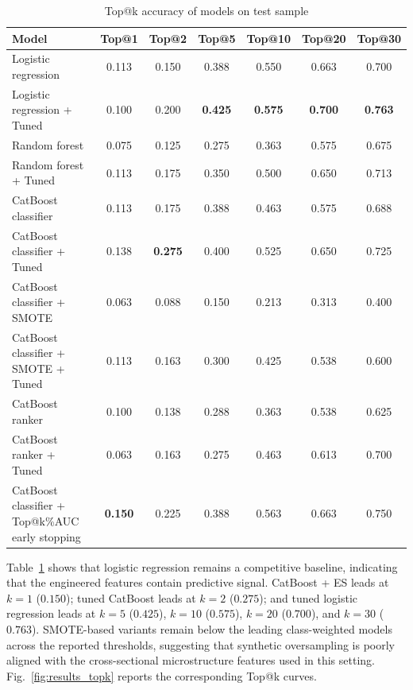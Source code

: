 \documentclass{ieeeaccess}
\begin{document}
\begin{table}[!t]
    \centering
    \setlength{\tabcolsep}{6pt} %
    \renewcommand{\arraystretch}{1.2} %
    \caption{Top@k accuracy of models on test sample}
    \begin{tabular}{lcccccc}
        \toprule
        Model & Top@1 & Top@2 & Top@5 & Top@10 & Top@20 & Top@30 \\
        \midrule
        Logistic regression & 0.113 & 0.150 & 0.388 & 0.550 & 0.663 & 0.700 \\
        Logistic regression + Tuned & 0.100 & 0.200 & \textbf{0.425} & \textbf{0.575} & \textbf{0.700} & \textbf{0.763} \\
        Random forest & 0.075 & 0.125 & 0.275 & 0.363 & 0.575 & 0.675 \\
        Random forest + Tuned & 0.113 & 0.175 & 0.350 & 0.500 & 0.650 & 0.713 \\
        CatBoost classifier & 0.113 & 0.175 & 0.388 & 0.463 & 0.575 & 0.688 \\
        CatBoost classifier + Tuned & 0.138 & \textbf{0.275} & 0.400 & 0.525 & 0.650 & 0.725 \\
        CatBoost classifier + SMOTE & 0.063 & 0.088 & 0.150 & 0.213 & 0.313 & 0.400 \\
        CatBoost classifier + SMOTE + Tuned & 0.113 & 0.163 & 0.300 & 0.425 & 0.538 & 0.600 \\
        CatBoost ranker & 0.100 & 0.138 & 0.288 & 0.363 & 0.538 & 0.625 \\
        CatBoost ranker + Tuned & 0.063 & 0.163 & 0.275 & 0.463 & 0.613 & 0.700 \\
        CatBoost classifier + Top@k\%AUC early stopping & \textbf{0.150} & 0.225 & 0.388 & 0.563 & 0.663 & 0.750 \\
        \bottomrule
    \end{tabular}
    \label{table:results_topk}
\end{table}


Table~\ref{table:results_topk} shows that logistic regression remains a competitive baseline, indicating that the engineered features contain predictive signal. CatBoost + ES leads at $k=1$ ($0.150$); tuned CatBoost leads at $k=2$ ($0.275$); and tuned logistic regression leads at $k=5$ ($0.425$), $k=10$ ($0.575$), $k=20$ ($0.700$), and $k=30$ ($0.763$). SMOTE-based variants remain below the leading class-weighted models across the reported thresholds, suggesting that synthetic oversampling is poorly aligned with the cross-sectional microstructure features used in this setting. Fig.~\ref{fig:results_topk} reports the corresponding Top@k curves.
\end{document}
